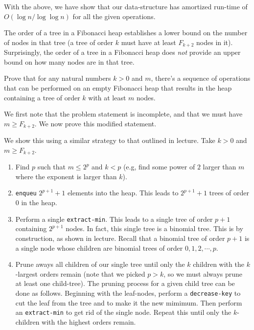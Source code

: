 \documentclass[12pt]{exam}
\newcommand{\Q}[1]{\question{\large{\textbf{#1}}}}
\newcommand*{\bigo}[1]{O \left( #1 \right)}
\begin{document}
\begin{questions}
\begin{solution}
With the above, we have show that our data-structure has amortized run-time of $\bigo{\log n / \log \log n}$ for all the given operations.

\end{solution}

\newpage

\Q{Problem Three: Palos Altos (3 Points)}

The order of a tree in a Fibonacci heap establishes a lower bound on the number of nodes in that tree (a tree of order $k$ must have at least $F_{k+2}$ nodes in it). Surprisingly, the order of a tree in a Fibonacci heap does \textit{not} provide an upper bound on how many nodes are in that tree.

Prove that for any natural numbers $k > 0$ and $m$, there's a sequence of operations that can be performed on an empty Fibonacci heap that results in the heap containing a tree of order $k$ with at least $m$ nodes.

\begin{solution}
We first note that the problem statement is incomplete, and that we must have $m \geq F_{k+2}$. We now prove this modified statement.

We show this using a similar strategy to that outlined in lecture. Take $k > 0$ and $m \geq F_{k+2}$.
\begin{enumerate}
  \item Find $p$ such that $m \leq 2^p$ and $k < p$ (e.g, find some power of $2$ larger than $m$ where the exponent is larger than $k$).
  \item \texttt{enqueu} $2^{p+1} + 1$ elements into the heap. This leads to $2^{p+1} + 1$ trees of order $0$ in the heap.
  \item Perform a single \texttt{extract-min}. This leads to a single tree of order $p+1$ containing $2^{p+1}$ nodes. In fact, this single tree is a binomial tree. This is by construction, as shown in lecture. Recall that a binomial tree of order $p+1$ is a single node whose children are binomial trees of order $0, 1, 2, \cdots, p$.
  \item Prune aways all children of our single tree until only the $k$ children with the $k$-largest orders remain (note that we picked $p > k$, so we must always prune at least one child-tree). The pruning process for a given child tree can be done as follows. Beginning with the leaf-nodes, perform a \texttt{decrease-key} to cut the leaf from the tree and to make it the new mimimum. Then perform an \texttt{extract-min} to get rid of the single node. Repeat this until only the $k$-children with the highest orders remain.
\end{enumerate}


\end{solution}
\end{questions}
\end{document}
